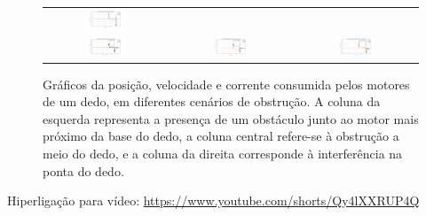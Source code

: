 \begin{figure}[H]
\begin{tabular}{ccc}
  \includegraphics[width=0.33\textwidth]{figs/appendix/teste_pos_obst/finger_vels_vel50_obs_ponta.png} \\
  \includegraphics[width=0.33\textwidth]{figs/appendix/teste_pos_obst/finger_currs_vel50_obs_motor1.png} &
  \includegraphics[width=0.33\textwidth]{figs/appendix/teste_pos_obst/finger_currs_vel50_obs_motor2.png} &
  \includegraphics[width=0.33\textwidth]{figs/appendix/teste_pos_obst/finger_currs_vel50_obs_ponta.png} \\
\end{tabular}
\caption{Gráficos da posição, velocidade e corrente consumida pelos motores de um dedo, em diferentes cenários de obstrução. A coluna da esquerda representa a presença de um obstáculo junto ao motor mais próximo da base do dedo, a coluna central refere-se à obstrução a meio do dedo, e a coluna da direita corresponde à interferência na ponta do dedo.}
\end{figure}

Hiperligação para vídeo: \url{https://www.youtube.com/shorts/Qy4lXXRUP4Q}

\label{appendix:teste_posições_obstaculos}
